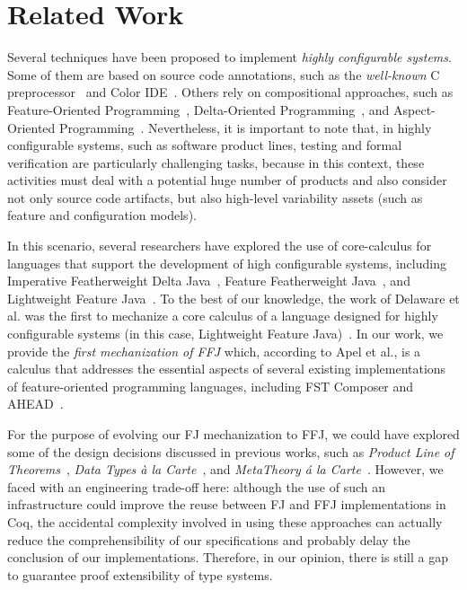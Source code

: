 \section{Related Work}\label{seq:related}

Several techniques have been proposed to implement
\emph{highly configurable systems}. Some of
them are based on source code annotations, such as
the \emph{well-known} C preprocessor~\cite{stallman:cpp} and Color IDE~\cite{kastner:icse2008}. Others
rely on compositional approaches, such as
Feature-Oriented Programming~\cite{batory-tse2004,batory_feature-oriented_2004},
Delta-Oriented Programming~\cite{schaefer_delta-oriented_2010}, 
and Aspect-Oriented Programming~\cite{kiczales:ecoop2001,alves:splc2005}.
Nevertheless, it is important to
note that, in highly configurable systems, such as software
product lines, testing and formal verification are particularly
challenging tasks, because in this context,
these activities must deal with a potential huge number of
products and also consider not only source code artifacts,
but also high-level variability assets (such as feature and
configuration models).

In this scenario, several researchers have explored
the use of core-calculus for languages that
support the development of high configurable systems,
including Imperative Featherweight Delta Java~\cite{schaefer:aosd2011}, Feature
Featherweight Java~\cite{apel_feature_2008}, and Lightweight Feature Java~\cite{delaware:fse-2009}.
To the best of our knowledge, the work of Delaware
et al. was the first to mechanize a core calculus
of a language designed for highly configurable systems (in
this case, Lightweight Feature Java)~\cite{delaware:fse-2009}. 
In our work, we provide the \emph{first mechanization of \acf{FFJ}}
which, according to Apel et al., is a calculus that
addresses the essential aspects of several
existing implementations of feature-oriented programming
languages, including FST Composer and AHEAD~\cite{apel_feature_2008}. %

For the purpose of evolving our \ac{FJ} mechanization
to \ac{FFJ}, we could have explored some of the
design decisions discussed in previous works, such as
\emph{Product Line of Theorems}~\cite{delaware:oopsla2011},
\emph{Data Types \`{a} la Carte}~\cite{swierstra_2008},
and \emph{MetaTheory \'{a} la Carte}~\cite{delaware:popl2013}. %
However, we faced with
an engineering trade-off here: although the use of such an
infrastructure could improve the reuse between \ac{FJ} and \ac{FFJ}
implementations in Coq, the accidental complexity involved in
using these approaches can actually reduce the comprehensibility of our
specifications and probably delay the conclusion of our
implementations. Therefore, in our opinion, there is still a
gap to guarantee proof extensibility of type systems. 
